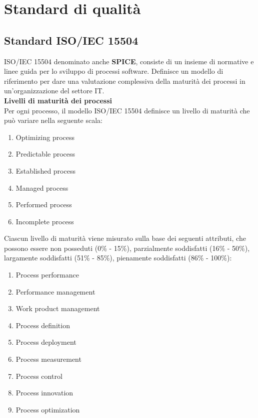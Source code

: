 \section{Standard di qualità} 
\subsection{Standard ISO/IEC 15504}\label{AppQualitaProcessi}
ISO/IEC 15504 denominato anche \textbf{SPICE}, consiste di un insieme di normative e linee guida per lo sviluppo di processi software.
Definisce un modello di riferimento per dare una valutazione complessiva della maturità dei processi in un'organizzazione del settore IT.\\
\textbf{Livelli di maturità dei processi}\\
Per ogni processo, il modello ISO/IEC 15504 definisce un livello di maturità che può variare nella seguente scala:
\begin{enumerate}
\item Optimizing process
\item Predictable process
\item Established process
\item Managed process
\item Performed process
\item Incomplete process
\end{enumerate}
Ciascun livello di maturità viene misurato sulla base dei seguenti attributi, che possono essere non posseduti (0\% - 15\%), parzialmente soddisfatti (16\% - 50\%), largamente soddisfatti (51\% - 85\%), pienamente soddisfatti (86\% - 100\%):
\begin{enumerate}
\item Process performance
\item Performance management
\item Work product management
\item Process definition
\item Process deployment
\item Process measurement
\item Process control
\item Process innovation
\item Process optimization
\end{enumerate}
